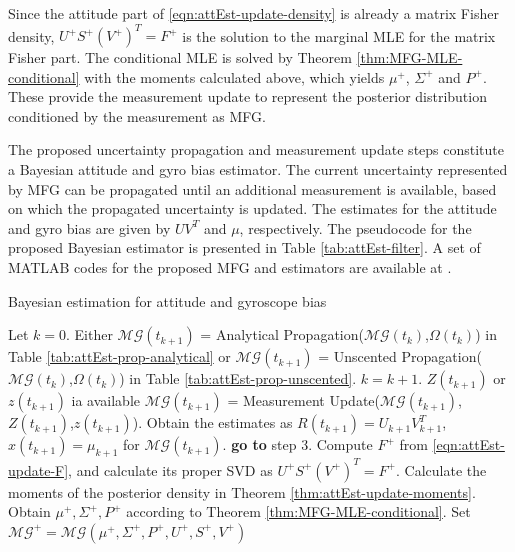 Since the attitude part of \eqref{eqn:attEst-update-density} is already a matrix Fisher density, $U^+S^+(V^+)^T = F^+$ is the solution to the marginal MLE for the matrix Fisher part.
The conditional MLE is solved by Theorem \ref{thm:MFG-MLE-conditional} with the moments calculated above, which yields $\mu^+$, $\Sigma^+$ and $P^+$.
These provide the measurement update to represent the posterior distribution conditioned by the measurement as MFG.

The proposed uncertainty propagation and measurement update steps constitute a Bayesian attitude and gyro bias estimator. 
The current uncertainty represented by MFG can be propagated until an additional measurement is available, based on which the propagated uncertainty is updated. 
The estimates for the attitude and gyro bias are given by $UV^T$ and $\mu$, respectively. 
The pseudocode for the proposed Bayesian estimator is presented in Table \ref{tab:attEst-filter}.
A set of MATLAB codes for the proposed MFG and estimators are available at \cite{MFGCode}.

\begin{table}
	\caption{Bayesian estimation for attitude and gyroscope bias \label{tab:attEst-filter}}
	\begin{algorithmic}[1]
		\algrule[0.8pt]
		\algrule
		\State Let $k=0$.
		\Repeat
		\State Either $\mathcal{MG}(t_{k+1})$ = Analytical Propagation($\mathcal{MG}(t_k)$,$\Omega(t_k)$) in Table \ref{tab:attEst-prop-analytical} or $\mathcal{MG}(t_{k+1})$ = Unscented Propagation($\mathcal{MG}(t_k)$,$\Omega(t_k)$) in Table \ref{tab:attEst-prop-unscented}.
		\State $k=k+1$.
		\Until $Z(t_{k+1})$ or $z(t_{k+1})$ ia available
		\State $\mathcal{MG}(t_{k+1})$ = Measurement Update($\mathcal{MG}(t_{k+1})$,$Z(t_{k+1})$,$z(t_{k+1})$).
		\State Obtain the estimates as $R(t_{k+1})=U_{k+1}V_{k+1}^T$, $x(t_{k+1})=\mu_{k+1}$ for $\mathcal{MG}(t_{k+1})$.
		\State \textbf{go to} step 3.
		\EndProcedure
		\algrule
		\State Compute $F^+$ from \eqref{eqn:attEst-update-F}, and calculate its proper SVD as $U^+S^+(V^+)^T=F^+$. 
		\State Calculate the moments of the posterior density in Theorem \ref{thm:attEst-update-moments}.
		\State Obtain $\mu^+,\Sigma^+,P^+$ according to Theorem \ref{thm:MFG-MLE-conditional}.
		\State Set $\mathcal{MG}^+ = \mathcal{MG}(\mu^+,\Sigma^+,P^+,U^+,S^+,V^+)$
		\EndProcedure
		\algrule[0.8pt]
	\end{algorithmic}
\end{table}

